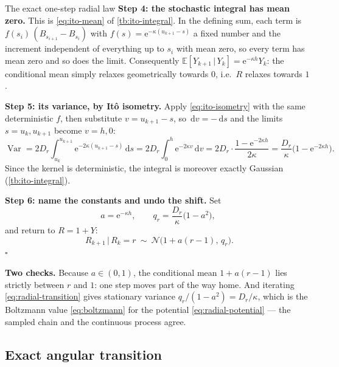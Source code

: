 \documentclass[11pt,a4paper]{article}
\newcommand{\E}{\mathbb{E}}
\newcommand{\N}{\mathcal{N}}
\newcommand{\given}{\,\vert\,}
\newcommand{\Var}{\operatorname{Var}}
\newcommand{\dd}{\,\mathrm d}
\newcommand{\e}{\mathrm e}
\newcounter{toolbox}
\begin{document}
\begin{toolbox}{The exact one-step radial law}
\textbf{Step 4: the stochastic integral has mean zero.} This is \eqref{eq:ito-mean} of
\cref{tb:ito-integral}. In the defining sum, each term is
$f(s_i)\,(B_{s_{i+1}}-B_{s_i})$ with $f(s)=\e^{-\kappa(u_{k+1}-s)}$ a fixed number and the
increment independent of everything up to $s_i$ with mean zero, so every term has mean zero
and so does the limit. Consequently $\E[Y_{k+1}\given Y_k]=\e^{-\kappa h}Y_k$: the conditional
mean simply relaxes geometrically towards $0$, i.e.\ $R$ relaxes towards $1$.

\textbf{Step 5: its variance, by It\^o isometry.} Apply \eqref{eq:ito-isometry} with the same
deterministic $f$, then substitute $v=u_{k+1}-s$, so $\dd v=-\dd s$ and the limits
$s=u_k,u_{k+1}$ become $v=h,0$:
\begin{equation}
 \Var
 =2D_r\int_{u_k}^{u_{k+1}}\e^{-2\kappa(u_{k+1}-s)}\dd s
 =2D_r\int_0^h\e^{-2\kappa v}\dd v
 =2D_r\cdot\frac{1-\e^{-2\kappa h}}{2\kappa}
 =\frac{D_r}{\kappa}\big(1-\e^{-2\kappa h}\big).
 \label{eq:radial-variance}
\end{equation}
Since the kernel is deterministic, the integral is moreover exactly Gaussian
(\cref{tb:ito-integral}).

\textbf{Step 6: name the constants and undo the shift.} Set
\begin{equation}
 a=\e^{-\kappa h},
 \qquad
 q_r=\frac{D_r}{\kappa}\big(1-a^2\big),
 \label{eq:a-qr}
\end{equation}
and return to $R=1+Y$:
\begin{equation}
 \boxed{\;R_{k+1}\given R_k=r\ \sim\ \N\big(1+a(r-1),\,q_r\big).}
 \label{eq:radial-transition}
\end{equation}
\hfill$\square$

\textbf{Two checks.} Because $a\in(0,1)$, the conditional mean $1+a(r-1)$ lies strictly between
$r$ and $1$: one step moves part of the way home. And iterating
\eqref{eq:radial-transition} gives stationary variance $q_r/(1-a^2)=D_r/\kappa$, which is the
Boltzmann value \eqref{eq:boltzmann} for the potential \eqref{eq:radial-potential} --- the
sampled chain and the continuous process agree.
\end{toolbox}

\subsection{Exact angular transition}\label{sec:angular-transition}
\end{document}
